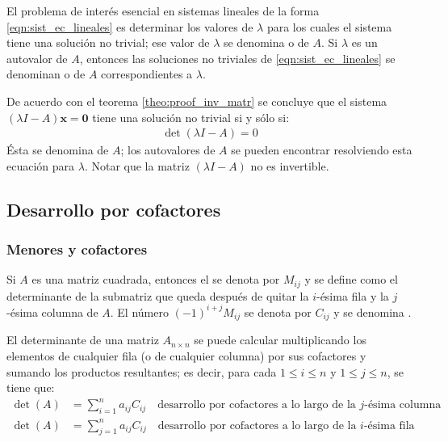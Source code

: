 \documentclass[a4paper,12pt]{article}
\begin{document}
El problema de interés esencial en sistemas lineales de la forma
\eqref{eqn:sist_ec_lineales} es determinar los valores de $\lambda$ para los
cuales el sistema tiene una solución no trivial; ese valor de $\lambda$ se
denomina  o  de $A$. Si $\lambda$ es un
autovalor de $A$, entonces las soluciones no triviales de
\eqref{eqn:sist_ec_lineales} se denominan  o
 de $A$ correspondientes a $\lambda$.

De acuerdo con el teorema \ref{theo:proof_inv_matr} se concluye que el sistema
$(\lambda I-A)\mathbf{x}=\mathbf{0}$ tiene una solución no trivial si y sólo si:
\begin{align}
  \det(\lambda I-A)=0
  \label{eqn:ec_caracteristica}
\end{align}
Ésta se denomina  de $A$; los autovalores de
$A$ se pueden encontrar resolviendo esta ecuación para $\lambda$. Notar que la
matriz $(\lambda I-A)$ no es invertible.

\subsection{Desarrollo por cofactores}

\subsubsection{Menores y cofactores}

\begin{concept}
  Si $A$ es una matriz cuadrada, entonces el 
  se denota por $M_{ij}$ y se define como el determinante de la submatriz que
  queda después de quitar la $i$-ésima fila y la $j$-ésima columna de
  $A$. El número $(-1)^{i+j}M_{ij}$ se denota por $C_{ij}$ y se denomina
  .
\end{concept}

\begin{theorem}
  El determinante de una matriz $A_{n\times n}$ se puede calcular
  multiplicando los elementos de cualquier fila (o de cualquier columna) por
  sus cofactores y sumando los productos resultantes; es decir, para cada
  $1\le i\le n$ y $1 \le j \le n$, se tiene que:
  \begin{align*}
    \det(A)&=\sum_{i=1}^n a_{ij}C_{ij} \quad \mbox{desarrollo por cofactores a
    lo largo de la $j$-ésima columna} \\
    \det(A)&=\sum_{j=1}^n a_{ij}C_{ij} \quad \mbox{desarrollo por cofactores a
    lo largo de la $i$-ésima fila}
  \end{align*}
  \label{theo:det_des_cof}
\end{theorem}
\end{document}
